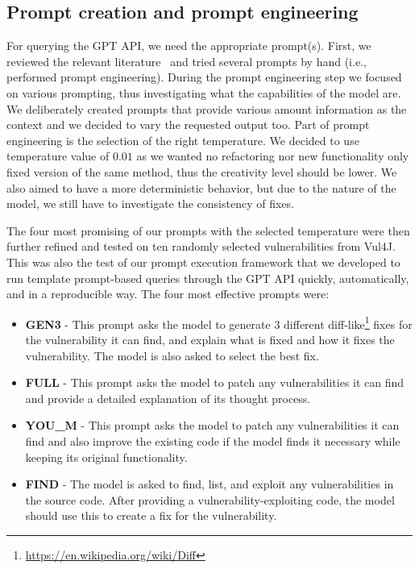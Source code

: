 \subsection{Prompt creation and prompt engineering}

%

For querying the GPT API, we need the appropriate prompt(s).
First, we reviewed the relevant literature~\cite{li2023large,wei2022chain} and tried several prompts by hand (i.e., performed prompt engineering).
During the prompt engineering step we focused on various prompting, thus investigating what the capabilities of the model are.
We deliberately created prompts that provide various amount information as the context and we decided to vary the requested output too.
Part of prompt engineering is the selection of the right temperature.
We decided to use temperature value of $0.01$ as we wanted no refactoring nor new functionality only fixed version of the same method, thus the creativity level should be lower.
We also aimed to have a more deterministic behavior, but due to the nature of the model, we still have to investigate the consistency of fixes.

The four most promising of our prompts with the selected temperature were then further refined and tested on ten randomly selected vulnerabilities from Vul4J.
This was also the test of our prompt execution framework that we developed to run template prompt-based queries through the GPT API quickly, automatically, and in a reproducible way.
The four most effective prompts were:

\begin{itemize}
	\item \textbf{GEN3} - This prompt asks the model to generate 3 different diff-like\footnote{\url{https://en.wikipedia.org/wiki/Diff}} fixes for the vulnerability it can find, and explain what is fixed and how it fixes the vulnerability. The model is also asked to select the best fix.
	\item \textbf{FULL} - This prompt asks the model to patch any vulnerabilities it can find and provide a detailed explanation of its thought process.
	\item \textbf{YOU\_M} - This prompt asks the model to patch any vulnerabilities it can find and also improve the existing code if the model finds it necessary while keeping its original functionality.
	\item \textbf{FIND} - The model is asked to find, list, and exploit any vulnerabilities in the source code. After providing a vulnerability-exploiting code, the model should use this to create a fix for the vulnerability.
\end{itemize}

